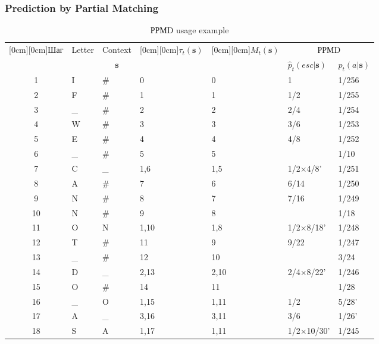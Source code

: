 \documentclass[14pt]{beamer}
\renewcommand{\vec}[1]{\ensuremath{\boldsymbol{#1}}}
\begin{document}
\begin{frame}
\frametitle{Prediction by Partial Matching}
\begin{itemize}    

    \begin{table}[htbp]
    \caption{РРМD usage example} \scriptsize{
    \begin{center}
    \scalebox{0.5} {
    \begin{tabular}
    {|c|l|l|l|l|l|l|} \hline %
    \raisebox{-1.50ex}[0cm][0cm]{Шаг}&
    {Letter}&
    {Context }&
    \raisebox{-1.50ex}[0cm][0cm]{$\tau _t ({\vec s})$}&
    \raisebox{-1.50ex}[0cm][0cm]{$M_t ({\vec s})$}&
    \multicolumn{2}{c|}{РРМD}  \\
    \cline{6-7}
     & & \multicolumn{1}{c|}{$\vec s$}&  &  & $\hat {p}_t(esc\vert {\vec s})$&
    $\hat {p}_t(a\vert {\vec s})$ \\ \hline %
    1& I& \textsf{{\#}}& 0& 0& 1& 1/256 \\ \hline %
    2& F& {\#}& 1& 1& 1/2& 1/255 \\ \hline %
    3& {\_}& {\#}& 2& 2& 2/4& 1/254 \\ \hline %
    4& W& {\#}& 3& 3& 3/6& 1/253 \\ \hline %
    5& E& {\#}& 4& 4& 4/8& 1/252 \\ \hline %
    6& {\_}& {\#}& 5& 5& & 1/10 \\ \hline %
    7& C& {\_}& 1,6& 1,5& 1/2$\times $4/8'& 1/251 \\\hline %
    8& A& {\#}& 7& 6& 6/14& 1/250 \\ \hline %
    9& N& {\#}& 8& 7& 7/16& 1/249 \\ \hline %
    10& N& {\#}& 9& 8& & 1/18 \\ \hline %
    11& O& N & 1,10& 1,8& 1/2$\times $8/18'& 1/248 \\ \hline %
    12& T& {\#}& 11& 9& 9/22& 1/247 \\ \hline %
    13& {\_}& {\#}& 12& 10& & 3/24 \\ \hline %
    14& D& {\_}& 2,13& 2,10& 2/4$\times $8/22'& 1/246 \\ \hline %
    15& O& {\#}& 14& 11& & 1/28 \\ \hline %
    16& {\_}& O & 1,15& 1,11& 1/2& 5/28' \\ \hline %
    17& A& {\_}& 3,16& 3,11& 3/6& 1/26' \\ \hline %
    18& S& A & 1,17& 1,11& 1/2$\times $10/30'& 1/245 \\\hline %

\end{tabular}}
\end{center}}
\end{table}
\end{itemize}
\end{frame}
\end{document}
